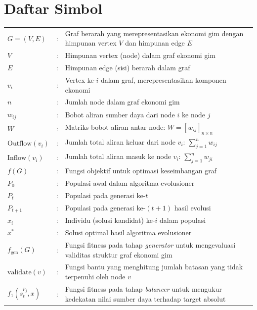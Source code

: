 \chapter*{Daftar Simbol}


\begin{center}
\small %
\renewcommand{\arraystretch}{1.05} %
\setlength{\tabcolsep}{4pt} %
\begin{tabular}{p{2.5cm}p{0.2cm}p{10cm}} %
$G = (V, E)$ & : & Graf berarah yang merepresentasikan ekonomi gim dengan himpunan vertex $V$ dan himpunan edge $E$ \\
$V$ & : & Himpunan vertex (node) dalam graf ekonomi gim \\
$E$ & : & Himpunan edge (sisi) berarah dalam graf \\
$v_i$ & : & Vertex ke-$i$ dalam graf, merepresentasikan komponen ekonomi \\
$n$ & : & Jumlah node dalam graf ekonomi gim \\
$w_{ij}$ & : & Bobot aliran sumber daya dari node $i$ ke node $j$ \\
$W$ & : & Matriks bobot aliran antar node: $W = [w_{ij}]_{n \times n}$ \\
$\text{Outflow}(v_i)$ & : & Jumlah total aliran keluar dari node $v_i$: $\sum_{j=1}^{n} w_{ij}$ \\
$\text{Inflow}(v_i)$ & : & Jumlah total aliran masuk ke node $v_i$: $\sum_{j=1}^{n} w_{ji}$ \\
$f(G)$ & : & Fungsi objektif untuk optimasi keseimbangan graf \\
$P_0$ & : & Populasi awal dalam algoritma evolusioner \\
$P_t$ & : & Populasi pada generasi ke-$t$ \\
$P_{t+1}$ & : & Populasi pada generasi ke-$(t+1)$ hasil evolusi \\
$x_i$ & : & Individu (solusi kandidat) ke-$i$ dalam populasi \\
$x^*$ & : & Solusi optimal hasil algoritma evolusioner \\
$f_{\text{gen}}(G)$ & : & Fungsi fitness pada tahap \textit{generator} untuk mengevaluasi validitas struktur graf ekonomi gim \\
$\mathrm{validate}(v)$ & : & Fungsi bantu yang menghitung jumlah batasan yang tidak terpenuhi oleh node $v$ \\
$f_1(s^{p_j}_t, x)$ & : & Fungsi fitness pada tahap \textit{balancer} untuk mengukur kedekatan nilai sumber daya terhadap target absolut \\

\end{tabular}
\end{center}
